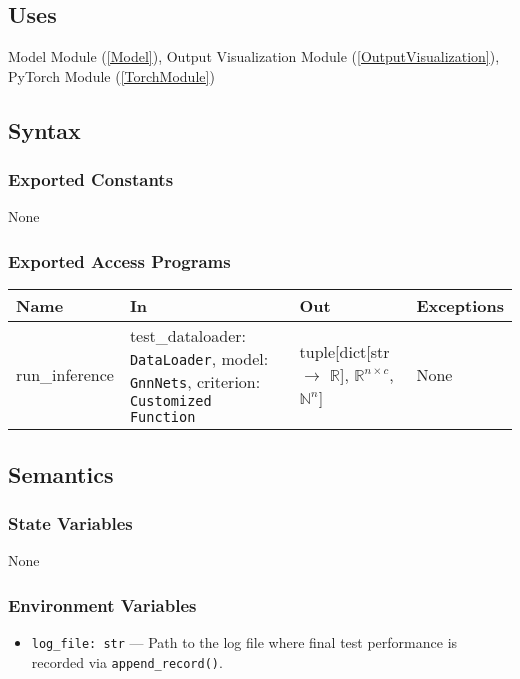 \documentclass[12pt, titlepage]{article}
\begin{document}
\subsection{Uses}
Model Module (\ref{Model}), Output Visualization Module (\ref{OutputVisualization}), PyTorch Module (\ref{TorchModule})

\subsection{Syntax}

\subsubsection{Exported Constants}
None

\subsubsection{Exported Access Programs}
\begin{center}
\begin{tabular}{p{3cm} >{\raggedright\arraybackslash}p{6cm} p{5cm} p{2.5cm}}
\hline
\textbf{Name} & \textbf{In} & \textbf{Out} & \textbf{Exceptions} \\
\hline
run\_inference & test\_dataloader: \texttt{DataLoader}, model: \texttt{GnnNets}, criterion: \texttt{Customized Function} & tuple[dict[str $\rightarrow$ \(\mathbb{R}\)], \(\mathbb{R}^{n \times c}\), \(\mathbb{N}^n\)] & None \\
\hline
\end{tabular}
\end{center}

\subsection{Semantics}

\subsubsection{State Variables}
None

\subsubsection{Environment Variables}
\begin{itemize}
  \item \texttt{log\_file: str} — Path to the log file where final test performance is recorded via \texttt{append\_record()}.
\end{itemize}
\end{document}
